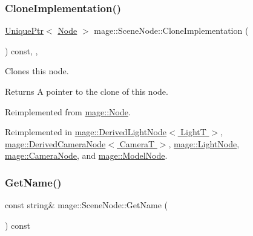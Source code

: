 \hypertarget{classmage_1_1_scene_node_a42d0d53ab804d38ebd584d2de6490eeb}{}\label{classmage_1_1_scene_node_a42d0d53ab804d38ebd584d2de6490eeb} 
\subsubsection{\texorpdfstring{Clone\+Implementation()}{CloneImplementation()}}
{\footnotesize\ttfamily \hyperlink{namespacemage_a8c307fbcc33bce9b7f2aa4c26c3b95cf}{Unique\+Ptr}$<$ \hyperlink{classmage_1_1_node}{Node} $>$ mage\+::\+Scene\+Node\+::\+Clone\+Implementation (\begin{DoxyParamCaption}{ }\end{DoxyParamCaption}) const\hspace{0.3cm}{\ttfamily [override]}, {\ttfamily [private]}, {\ttfamily [virtual]}}

Clones this node.

\begin{DoxyReturn}{Returns}
A pointer to the clone of this node. 
\end{DoxyReturn}


Reimplemented from \hyperlink{classmage_1_1_node_a71a4763bfd4cba5653488b490e61dc8f}{mage\+::\+Node}.



Reimplemented in \hyperlink{classmage_1_1_derived_light_node_acf8858989780bf45a45c55a7c5564314}{mage\+::\+Derived\+Light\+Node$<$ Light\+T $>$}, \hyperlink{classmage_1_1_derived_camera_node_aa965751029ebd6b41d3805b499a8304e}{mage\+::\+Derived\+Camera\+Node$<$ Camera\+T $>$}, \hyperlink{classmage_1_1_light_node_aea97601d0a4b8073a1c655ca334af242}{mage\+::\+Light\+Node}, \hyperlink{classmage_1_1_camera_node_a002d3a2b41cda270a26ca5d8f3a17f55}{mage\+::\+Camera\+Node}, and \hyperlink{classmage_1_1_model_node_a34146201083015276b38240af307417f}{mage\+::\+Model\+Node}.

\hypertarget{classmage_1_1_scene_node_ab4d72e26370747c06ccb1461f3080b31}{}\label{classmage_1_1_scene_node_ab4d72e26370747c06ccb1461f3080b31} 
\subsubsection{\texorpdfstring{Get\+Name()}{GetName()}}
{\footnotesize\ttfamily const string\& mage\+::\+Scene\+Node\+::\+Get\+Name (\begin{DoxyParamCaption}{ }\end{DoxyParamCaption}) const\hspace{0.3cm}{\ttfamily [noexcept]}}

